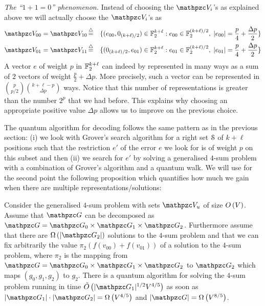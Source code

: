 \par{\em The ``$1+1=0$'' phenomenon.} Instead of choosing the $\zV_i$'s as explained above we will actually choose the $\zV_i$'s as
\begin{eqnarray}
\zV_{00}=\zV_{10} &\eqdef &\{(e_{00},0_{(k+\ell)/2})\in \Ft^{k+\ell} : e_{00 }\in \Ft^{(k+\ell)/2},\; |e_{00}|=\frac{p}{4} +\frac{\Delta p}{2}\} \label{eq:v00v10}\\
\zV_{01}=\zV_{11} &\eqdef &\{(0_{(k+\ell)/2},e_{01})\in \Ft^{k+\ell} : e_{01 }\in \Ft^{(k+\ell)/2},\; |e_{01}|=\frac{p}{4} +\frac{\Delta p}{2}\} \label{eq:v01v11}
\end{eqnarray}
A vector $e$ of weight $p$ in $\mathbb{F}_2^{k+\ell}$ can indeed by represented in many ways as a sum of $2$ vectors of weight $\frac{p}{2} +\Delta p$. More precisely, such a vector can be 
represented in 
$
\binom{p}{p/2} \binom{k+\ell-p}{\Delta p} 
$
ways. Notice that this number of representations is greater than the number $2^p$ that we had before. This explains why choosing an appropriate
positive value $\Delta p$ allows us to improve on the previous choice.

 

The quantum algorithm for decoding follows the same pattern as in the previous section:
(i) we look with Grover's search algorithm for a right set $\mathcal{S}$ of $k + \ell$ positions 
such that the restriction $e'$ of the error $e$ we look for is of weight $p$ on this subset
and then (ii) we search for $e'$ by solving a generalised $4$-sum problem  with a combination
of Grover's algorithm and a quantum walk. We will use for the second point the following proposition
which quantifies how much we gain when there are multiple representations/solutions:

\begin{proposition}\label{prop:improvement}
Consider the generalised $4$-sum problem  with sets $\zV_u$ of size  $O\left( V \right)$. Assume that 
$\zG$ can be decomposed as $\zG =\zG_0 \times \zG_1 \times \zG_2$. Furthermore assume that 
there are $\Om{|\zG_2|}$ solutions to the $4$-sum problem and that we can fix arbitrarily 
the value $\pi_2\left(f(v_{00})+f(v_{01})\right)$ of a solution to the $4$-sum problem, 
where $\pi_2$ is the mapping from $\zG =\zG_0 \times \zG_1 \times \zG_2$ to $\zG_2$ which maps 
$(g_0,g_1,g_2)$ to $g_2$.
There is a quantum algorithm for solving the $4$-sum problem running in time $\OOt{|\zG_1|^{1/2}V^{4/5}}$
as soon as $|\zG_1|\cdot|\zG_2| = \Om{V^{4/5}}$ and $|\zG| = \Om{V^{8/5}}$.
\end{proposition}

